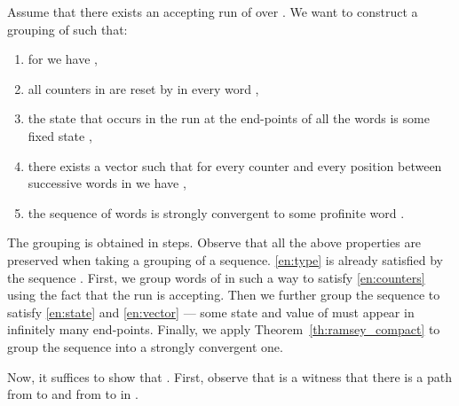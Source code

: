\documentclass{LMCS}
\begin{document}
Assume that there exists an accepting run  of  over . We want to construct a grouping  of  such that:
\begin{enumerate}[label=S.\arabic*]
\item for  we have ,\label{en:type}
\item all counters in  are reset by  in every word ,\label{en:counters}
\item the state that occurs in the run  at the end-points of all the words  is some fixed state ,\label{en:state}
\item there exists a vector  such that for every counter  and every position  between successive words  in  we have ,\label{en:vector}
\item the sequence of words  is strongly convergent to some profinite word .\label{en:conv}
\end{enumerate}

The grouping  is obtained in steps. Observe that all the above properties are preserved when taking a grouping of a sequence. \ref{en:type} is already satisfied by the sequence . First, we group words of  in such a way to satisfy \ref{en:counters} using the fact that the run  is accepting. Then we further group the sequence to satisfy \ref{en:state} and \ref{en:vector} --- some state and value of  must appear in infinitely many end-points. Finally, we apply Theorem~\ref{th:ramsey_compact} to group the sequence into a strongly convergent one. 

Now, it suffices to show that . First, observe that  is a witness that there is a path from  to  and from  to  in .
\end{document}
